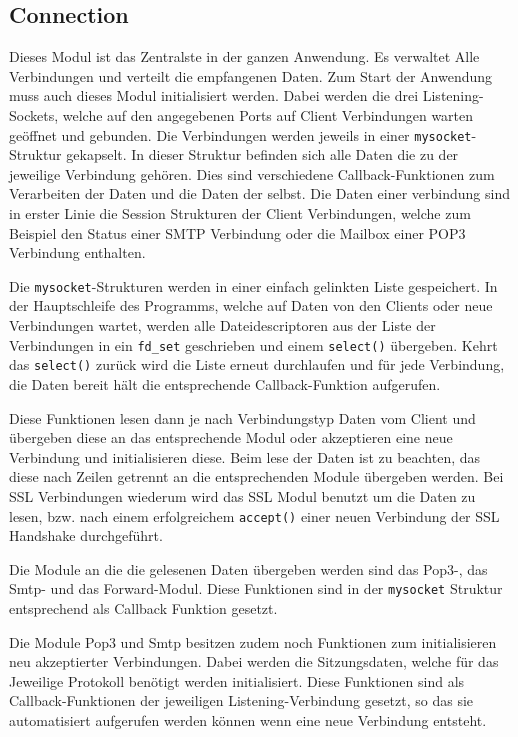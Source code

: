 \documentclass[final,a4paper,11pt,notitlepage,halfparskip]{scrreprt}
\begin{document}
\subsection{Connection}
Dieses Modul ist das Zentralste in der ganzen Anwendung. Es verwaltet Alle
Verbindungen und verteilt die empfangenen Daten. Zum Start der Anwendung muss
auch dieses Modul initialisiert werden. Dabei werden die drei Listening-Sockets,
welche auf den angegebenen Ports auf Client Verbindungen warten geöffnet und
gebunden. Die Verbindungen werden jeweils in einer \texttt{mysocket}-Struktur
gekapselt. In dieser Struktur befinden sich alle Daten die zu der jeweilige
Verbindung gehören. Dies sind verschiedene Callback-Funktionen zum Verarbeiten
der Daten und die Daten der selbst. Die Daten einer verbindung sind in erster
Linie die Session Strukturen der Client Verbindungen, welche zum Beispiel den
Status einer SMTP Verbindung oder die Mailbox einer POP3 Verbindung enthalten.

Die \texttt{mysocket}-Strukturen werden in einer einfach gelinkten Liste
gespeichert. In der Hauptschleife des Programms, welche auf Daten von den
Clients oder neue Verbindungen wartet, werden alle Dateidescriptoren aus der
Liste der Verbindungen in ein \texttt{fd\_set} geschrieben und einem
\texttt{select()} übergeben. Kehrt das \texttt{select()} zurück wird die Liste
erneut durchlaufen und für jede Verbindung, die Daten bereit hält die
entsprechende Callback-Funktion aufgerufen.

Diese Funktionen lesen dann je nach Verbindungstyp Daten vom Client und
übergeben diese an das entsprechende Modul oder akzeptieren eine neue Verbindung
und initialisieren diese.
Beim lese der Daten ist zu beachten, das diese nach Zeilen getrennt an die
entsprechenden Module übergeben werden. Bei SSL Verbindungen wiederum wird das
SSL Modul benutzt um die Daten zu lesen, bzw. nach einem erfolgreichem 
\texttt{accept()} einer neuen Verbindung der SSL Handshake durchgeführt.

Die Module an die die gelesenen Daten übergeben werden sind das Pop3-, das 
Smtp- und das Forward-Modul. Diese Funktionen sind in der \texttt{mysocket}
Struktur entsprechend als Callback Funktion gesetzt.

Die Module Pop3 und Smtp besitzen zudem noch Funktionen zum initialisieren neu
akzeptierter Verbindungen. Dabei werden die Sitzungsdaten, welche für das 
Jeweilige Protokoll benötigt werden initialisiert. Diese Funktionen sind als 
Callback-Funktionen der jeweiligen Listening-Verbindung gesetzt, so das sie 
automatisiert aufgerufen werden können wenn eine neue Verbindung entsteht.
\end{document}
